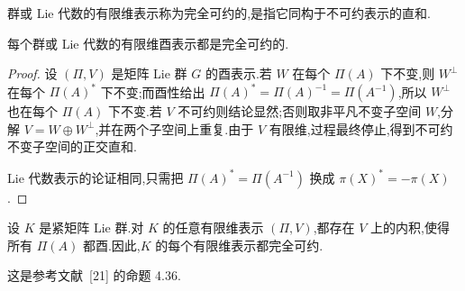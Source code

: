 {\begin{definition}[完全可约表示]\label{def:completely-reducible-representation}
群或 Lie 代数的有限维表示称为完全可约的,是指它同构于不可约表示的直和.
\end{definition}

\begin{proposition}[有限维酉表示完全可约]\label{prop:unitary-completely-reducible}
每个群或 Lie 代数的有限维酉表示都是完全可约的.
\end{proposition}

\begin{proof}
设 $(\Pi,V)$ 是矩阵 Lie 群 $G$ 的酉表示.若 $W$ 在每个 $\Pi(A)$ 下不变,则 $W^\perp$ 在每个 $\Pi(A)^*$ 下不变;而酉性给出 $\Pi(A)^*=\Pi(A)^{-1}=\Pi(A^{-1})$,所以 $W^\perp$ 也在每个 $\Pi(A)$ 下不变.若 $V$ 不可约则结论显然;否则取非平凡不变子空间 $W$,分解 $V=W\oplus W^\perp$,并在两个子空间上重复.由于 $V$ 有限维,过程最终停止,得到不可约不变子空间的正交直和.

Lie 代数表示的论证相同,只需把 $\Pi(A)^*=\Pi(A^{-1})$ 换成 $\pi(X)^*=-\pi(X)$.
\end{proof}

\begin{proposition}[紧群的有限维表示酉化]\label{prop:compact-group-unitarization}
设 $K$ 是紧矩阵 Lie 群.对 $K$ 的任意有限维表示 $(\Pi,V)$,都存在 $V$ 上的内积,使得所有 $\Pi(A)$ 都酉.因此,$K$ 的每个有限维表示都完全可约.
\end{proposition}

这是参考文献~[21] 的命题 4.36.
}

